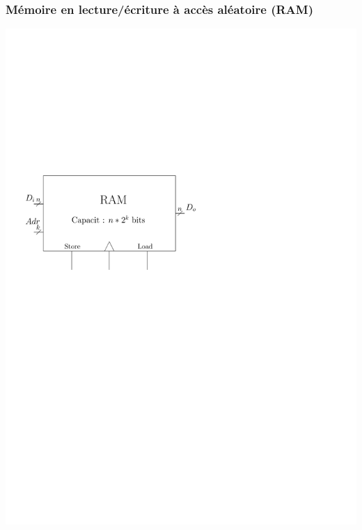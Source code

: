 \documentclass{beamer}
\begin{document}
\begin{frame}
\frametitle{Mémoire en lecture/écriture à accès aléatoire (RAM)}

\begin{minipage}[c]{.4\linewidth}
\includegraphics[width=\columnwidth]{Figs/ram.pdf}
\end{minipage}\hfill
\begin{minipage}[c]{.4\linewidth}

\end{minipage}
\end{frame}
\end{document}
